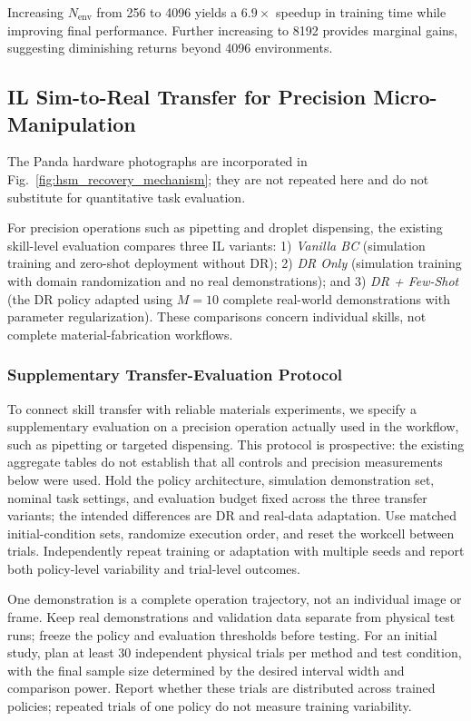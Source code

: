 Increasing $N_{\text{env}}$ from 256 to 4096 yields a $6.9\times$ speedup in training time while improving final performance. Further increasing to 8192 provides marginal gains, suggesting diminishing returns beyond 4096 environments.

\subsection{IL Sim-to-Real Transfer for Precision Micro-Manipulation}
\label{subsec:exp_il_pipetting}

The Panda hardware photographs are incorporated in Fig.~\ref{fig:hsm_recovery_mechanism}; they are not repeated here and do not substitute for quantitative task evaluation.

For precision operations such as pipetting and droplet dispensing, the existing skill-level evaluation compares three IL variants: 1) \textit{Vanilla BC} (simulation training and zero-shot deployment without DR); 2) \textit{DR Only} (simulation training with domain randomization and no real demonstrations); and 3) \textit{DR + Few-Shot} (the DR policy adapted using $M=10$ complete real-world demonstrations with parameter regularization). These comparisons concern individual skills, not complete material-fabrication workflows.

\subsubsection{Supplementary Transfer-Evaluation Protocol}
\label{subsec:transfer_protocol}
To connect skill transfer with reliable materials experiments, we specify a supplementary evaluation on a precision operation actually used in the workflow, such as pipetting or targeted dispensing. This protocol is prospective: the existing aggregate tables do not establish that all controls and precision measurements below were used. Hold the policy architecture, simulation demonstration set, nominal task settings, and evaluation budget fixed across the three transfer variants; the intended differences are DR and real-data adaptation. Use matched initial-condition sets, randomize execution order, and reset the workcell between trials. Independently repeat training or adaptation with multiple seeds and report both policy-level variability and trial-level outcomes.

One demonstration is a complete operation trajectory, not an individual image or frame. Keep real demonstrations and validation data separate from physical test runs; freeze the policy and evaluation thresholds before testing. For an initial study, plan at least 30 independent physical trials per method and test condition, with the final sample size determined by the desired interval width and comparison power. Report whether these trials are distributed across trained policies; repeated trials of one policy do not measure training variability.

